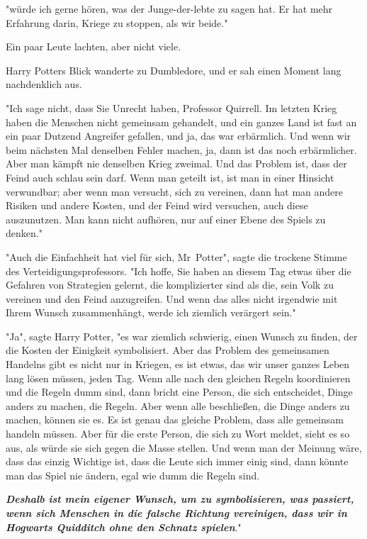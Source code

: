 {"würde ich gerne hören, was der Junge-der-lebte zu sagen hat. Er hat mehr Erfahrung darin, Kriege zu stoppen, als wir beide."

Ein paar Leute lachten, aber nicht viele.

Harry Potters Blick wanderte zu Dumbledore, und er sah einen Moment lang nachdenklich aus.

"Ich sage nicht, dass Sie Unrecht haben, Professor Quirrell. Im letzten Krieg haben die Menschen nicht gemeinsam gehandelt, und ein ganzes Land ist fast an ein paar Dutzend Angreifer gefallen, und ja, das war erbärmlich. Und wenn wir beim nächsten Mal denselben Fehler machen, ja, dann ist das noch erbärmlicher. Aber man kämpft nie denselben Krieg zweimal. Und das Problem ist, dass der Feind auch schlau sein darf. Wenn man geteilt ist, ist man in einer Hinsicht verwundbar; aber wenn man versucht, sich zu vereinen, dann hat man andere Risiken und andere Kosten, und der Feind wird versuchen, auch diese auszunutzen. Man kann nicht aufhören, nur auf einer Ebene des Spiels zu denken."

"Auch die Einfachheit hat viel für sich, Mr~Potter", sagte die trockene Stimme des Verteidigungsprofessors. "Ich hoffe, Sie haben an diesem Tag etwas über die Gefahren von Strategien gelernt, die komplizierter sind als die, sein Volk zu vereinen und den Feind anzugreifen. Und wenn das alles nicht irgendwie mit Ihrem Wunsch zusammenhängt, werde ich ziemlich verärgert sein."

"Ja", sagte Harry Potter, "es war ziemlich schwierig, einen Wunsch zu finden, der die Kosten der Einigkeit symbolisiert. Aber das Problem des gemeinsamen Handelns gibt es nicht nur in Kriegen, es ist etwas, das wir unser ganzes Leben lang lösen müssen, jeden Tag. Wenn alle nach den gleichen Regeln koordinieren und die Regeln dumm sind, dann bricht eine Person, die sich entscheidet, Dinge anders zu machen, die Regeln. Aber wenn alle beschließen, die Dinge anders zu machen, können sie es. Es ist genau das gleiche Problem, dass alle gemeinsam handeln müssen. Aber für die erste Person, die sich zu Wort meldet, sieht es so aus, als würde sie sich gegen die Masse stellen. Und wenn man der Meinung wäre, dass das einzig Wichtige ist, dass die Leute sich immer einig sind, dann könnte man das Spiel nie ändern, egal wie dumm die Regeln sind.

\textbf{\emph{Deshalb ist mein eigener Wunsch, um zu symbolisieren, was passiert, wenn sich Menschen in die falsche Richtung vereinigen, dass wir in Hogwarts Quidditch ohne den Schnatz spielen}}."

}

